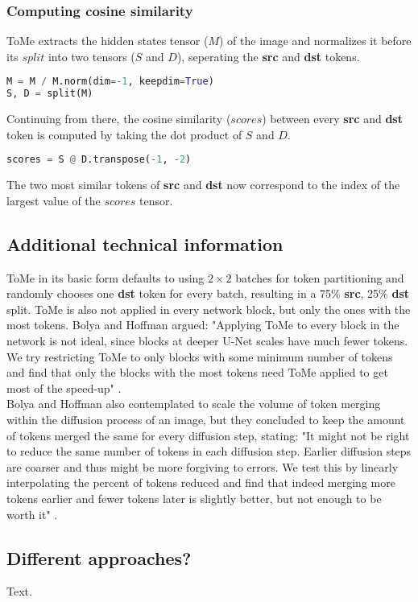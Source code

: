 \newpage
\subsubsection*{Computing cosine similarity}
ToMe extracts the hidden states tensor (\(M\)) of the image and normalizes it before its \(split\) into two tensors (\(S\) and \(D\)), seperating the \textbf{src} and \textbf{dst} tokens.
\begin{lstlisting}[language=Python]
M = M / M.norm(dim=-1, keepdim=True)
S, D = split(M)
\end{lstlisting}
Continuing from there, the cosine similarity (\(scores\)) between every \textbf{src} and \textbf{dst} token is computed by taking the dot product of \(S\) and \(D\).
\begin{lstlisting}[language=Python]
scores = S @ D.transpose(-1, -2)
\end{lstlisting}
The two most similar tokens of \textbf{src} and \textbf{dst} now correspond to the index of the largest value of the \(scores\) tensor.



\subsection{Additional technical information}
ToMe in its basic form defaults to using \(2 \times 2\) batches for token partitioning and randomly chooses one \textbf{dst} token for every batch, resulting in a 75\% \textbf{src}, 25\% \textbf{dst} split. 
ToMe is also not applied in every network block, but only the ones with the most tokens. Bolya and Hoffman argued:
"Applying ToMe to every block in the network is not ideal, since blocks at deeper U-Net scales have much fewer tokens. We try restricting ToMe to only blocks with some minimum number of tokens and find that only the blocks with the most tokens need ToMe applied to get most of the speed-up" \cite{bolya2023tomesd}.\\
Bolya and Hoffman also contemplated to scale the volume of token merging within the diffusion process of an image, but they concluded to keep the amount of tokens merged the same for every diffusion step, stating: "It might not be right to reduce the same number of tokens in each diffusion step. Earlier diffusion steps are coarser and thus might be more forgiving to errors. We test this by linearly interpolating the percent of tokens reduced and find that indeed merging more tokens earlier and fewer tokens later is slightly better, but not enough to be worth it" \cite{bolya2023tomesd}.



\subsection{Different approaches?}
Text.


